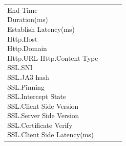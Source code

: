 \begin{description}
\begin{longtable}{p{}|p{}|p{}|p{}}
{                                                                                                                            End Time\\
                                                                                                                            Duration(ms)\\
                                                                                                                            Establish Latency(ms)\\
                                                                                                                            Http.Host\\
                                                                                                                            Http.Domain\\
                                                                                                                            Http.URL
                                                                                                                            Http.Content Type\\
                                                                                                                            SSL.SNI \\
                                                                                                                            SSL.JA3 hash\\
                                                                                                                            SSL.Pinning\\
                                                                                                                            SSL.Intercept State\\
                                                                                                                            SSL.Client Side Version\\
                                                                                                                            SSL.Server Side Version\\
                                                                                                                            SSL.Certificate Verify\\
                                                                                                                            SSL.Client Side Latency(ms)\\
}
\end{longtable}
\end{description}
